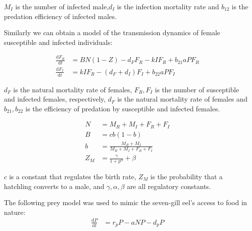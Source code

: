 \documentclass[CTeX = true]{mcmthesis}  %
\begin{document}
$M_I$ is the number of infected male,$d_I$ is the infection mortality rate and $b_{12}$ is the predation efficiency of infected males.

Similarly we can obtain a model of the transmission dynamics of female susceptible and infected individuals:

\begin{equation}
\begin{aligned}
\frac{\mathrm{d} F_R}{\mathrm{d} t} &= BN(1-Z)-d_FF_R-kIF_R+b_{21}aPF_R   \\
\frac{\mathrm{d} F_I}{\mathrm{d} t} &= kIF_R-(d_F+d_I)F_I+b_{22}aPF_I 
\end{aligned}
\end{equation}

$d_F$ is the natural mortality rate of females, $F_R,F_I$ is the number of susceptible and infected females, respectively, $d_F$ is the natural mortality rate of females and $b_{21},b_{22}$ is the efficiency of predation by susceptible and infected females.

\begin{equation}
\begin{aligned}
N &= M_R+M_I+F_R+F_I   \\
B &= cb(1-b)   \\
b &= \frac{M_R+M_I}{M_R+M_I+F_R+F_I}   \\
Z_{M} &= \frac{\gamma }{1+p^{\alpha } } +\beta 
\end{aligned}
\end{equation}

$c$ is a constant that regulates the birth rate, $Z_M$ is the probability that a hatchling converts to a male, and $\gamma,\alpha,\beta$ are all regulatory constants.

The following prey model was used to mimic the seven-gill eel's access to food in nature:
\begin{equation}
\begin{aligned}
\frac{\mathrm{d} P}{\mathrm{d} t} &= r_pP-aNP-d_pP
\end{aligned}
\end{equation}
\end{document}
